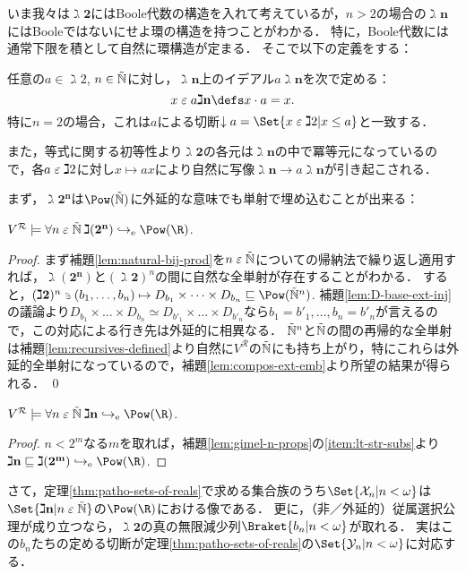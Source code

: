 \documentclass[realisability.tex]{subfiles}
\begin{document}
いま我々は$\gimel \mathbf{2}$にはBoole代数の構造を入れて考えているが，$n > 2$の場合の$\gimel \mathbf{n}$にはBooleではないにせよ環の構造を持つことがわかる．
特に，Boole代数には通常下限を積として自然に環構造が定まる．
そこで以下の定義をする：

\begin{definition}
 任意の$a \in \gimel 2$, $n \in \mathord{\tilde{\mathbb{N}}}$に対し，$\gimel \mathbf{n}$上のイデアル$a\gimel\mathbf{n}$を次で定める：
 \[
  x \strin a \gimel\mathbf{n} \defs x \cdot a = x.
 \]
 特に$n = 2$の場合，これは$a$による切断$\downarrow a = \Set{x \strin \gimel 2| x \leq a}$と一致する．

 また，等式に関する初等性より$\gimel \mathbf{2}$の各元は$\gimel \mathbf{n}$の中で冪等元になっているので，各$a \mathrel{\varepsilon} \gimel 2$に対し$x \mapsto a x$により自然に写像$\gimel \mathbf{n} \to a \gimel \mathbf{n}$が引き起こされる．
\end{definition}

まず，$\gimel \mathbf{2^n}$は$\Pow(\NN)$に外延的な意味でも単射で埋め込むことが出来る：
\begin{lemma}
 $V^{\mathcal{R}} \models \forall n \strin \NN \: \gimel(\mathbf{2^n}) \eembto \Pow(\R)$.
\end{lemma}
\begin{proof}
 まず補題\ref{lem:natural-bij-prod}を$n \mathrel{\varepsilon} \mathord{\tilde{\mathbb{N}}}$についての帰納法で繰り返し適用すれば，$\gimel(\mathbf{2^n})$と$(\gimel \mathbf{2})^n$の間に自然な全単射が存在することがわかる．
 すると，$(\gimel\mathbf{2})^n \strni (b_1, \dots, b_n) \mapsto D_{b_1} \times \dots \times D_{b_n} \sqsubseteq \Pow(\NN^n)$.
 補題\ref{lem:D-base-ext-inj}の議論より$D_{b_1} \times \dots \times D_{b_n} \simeq D_{b'_1} \times \dots \times D_{b'_n}$なら$b_1 = b'_1, \dots, b_n = b'_n$が言えるので，この対応による行き先は外延的に相異なる．
 $\mathord{\tilde{\mathbb{N}}}^n$と$\mathord{\tilde{\mathbb{N}}}$の間の再帰的な全単射は補題\ref{lem:recursives-defined}より自然に$V^{\mathcal{R}}$の$\mathord{\tilde{\mathbb{N}}}$にも持ち上がり，特にこれらは外延的全単射になっているので，補題\ref{lem:compos-ext-emb}より所望の結果が得られる． \qed
\end{proof}

\begin{corollary}\label{cor:gimels-ext-embeds}
 $V^{\mathcal{R}} \models \forall n \strin \NN\: \gimel\mathbf{n} \eembto \Pow(\R)$.
\end{corollary}
\begin{proof}
 $n < 2^m$なる$m$を取れば，補題\ref{lem:gimel-n-props}の\ref{item:lt-str-subs}より$\gimel\mathbf{n} \sqsubseteq \gimel (\mathbf{2^m}) \eembto \Pow(\R)$.
\end{proof}
さて，定理\ref{thm:patho-sets-of-reals}で求める集合族のうち$\Set{\mathcal{X}_n | n < \omega}$は$\Set{\gimel \mathbf{n} | n \strin \NN}$の$\Pow(\R)$における像である．
更に，（非／外延的）従属選択公理が成り立つなら，$\gimel \mathbf{2}$の真の無限減少列$\Braket{b_n | n < \omega}$が取れる．
実はこの$b_n$たちの定める切断が定理\ref{thm:patho-sets-of-reals}の$\Set{\mathcal{Y}_n | n < \omega}$に対応する．
\end{document}
